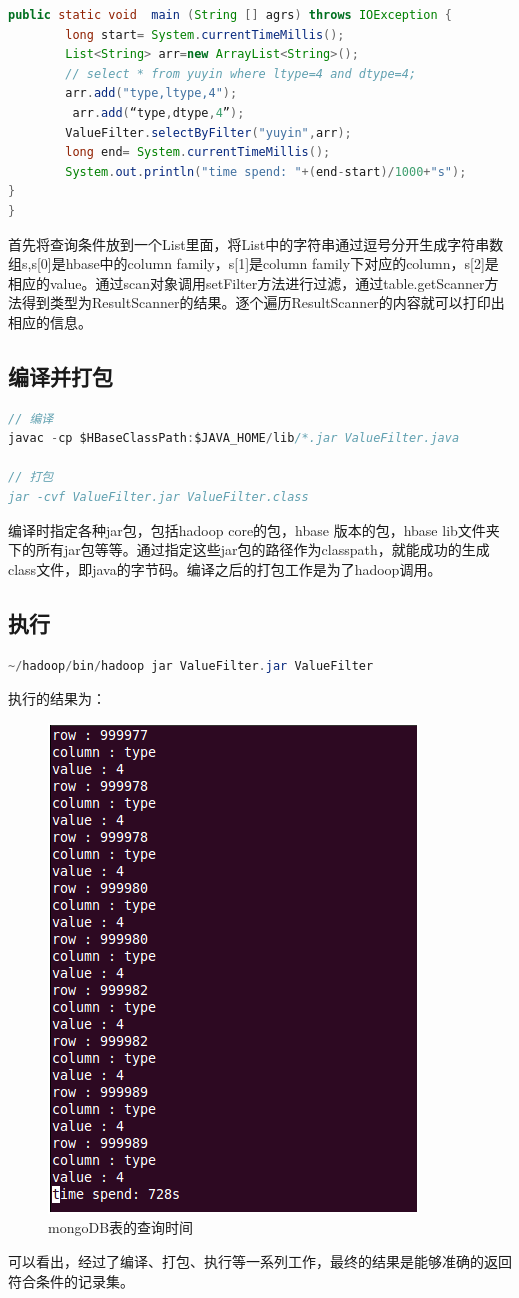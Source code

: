 \begin{lstlisting}[language=Java]
    public static void  main (String [] agrs) throws IOException {
        long start= System.currentTimeMillis();
        List<String> arr=new ArrayList<String>();
        // select * from yuyin where ltype=4 and dtype=4;
        arr.add("type,ltype,4");
		 arr.add(“type,dtype,4”);
        ValueFilter.selectByFilter("yuyin",arr);
        long end= System.currentTimeMillis();
        System.out.println("time spend: "+(end-start)/1000+"s");
}
}
\end{lstlisting}
首先将查询条件放到一个List里面，将List中的字符串通过逗号分开生成字符串数组s,s[0]是hbase中的column family，s[1]是column family下对应的column，s[2]是相应的value。通过scan对象调用setFilter方法进行过滤，通过table.getScanner方法得到类型为ResultScanner的结果。逐个遍历ResultScanner的内容就可以打印出相应的信息。

\subsection{编译并打包}
\begin{lstlisting}[language=Java]
// 编译 
javac -cp $HBaseClassPath:$JAVA_HOME/lib/*.jar ValueFilter.java

// 打包 
jar -cvf ValueFilter.jar ValueFilter.class
\end{lstlisting}

编译时指定各种jar包，包括hadoop core的包，hbase 版本的包，hbase lib文件夹下的所有jar包等等。通过指定这些jar包的路径作为classpath，就能成功的生成class文件，即java的字节码。编译之后的打包工作是为了hadoop调用。

\subsection{执行}
\begin{lstlisting}[language=Java]
~/hadoop/bin/hadoop jar ValueFilter.jar ValueFilter
\end{lstlisting}

执行的结果为：
\begin{figure}[!ht]
\centering
\includegraphics[scale=0.5]{photo/bcjg.png} 
\caption{mongoDB表的查询时间}
\end{figure} 

可以看出，经过了编译、打包、执行等一系列工作，最终的结果是能够准确的返回符合条件的记录集。